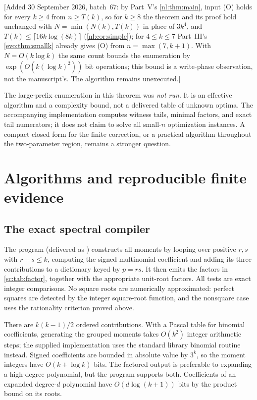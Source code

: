 \documentclass[11pt,a4paper]{article}
\numberwithin{equation}{section}
\theoremstyle{definition}
\theoremstyle{remark}
\begin{document}
[Added 30 September 2026, batch~67: by Part~V's \cref{nl:thm:main}, input
(O) holds for every $k\ge4$ from $n\ge T(k)$, so for $k\ge8$ the theorem and
its proof hold unchanged with $N=\min(N(k),T(k))$ in place of $3k^4$, and
$T(k)\le\lceil16k\log(8k)\rceil$ (\cref{nl:cor:simple}); for $4\le k\le7$
Part~III's \cref{evo:thm:smallk} already gives (O) from $n=\max(7,k+1)$.
With $N=O(k\log k)$ the same count bounds the enumeration by
$\exp(O(k(\log k)^2))$ bit operations; this bound is a write-phase
observation, not the manuscript's. The algorithm remains unexecuted.]

The large-prefix enumeration in this theorem was \emph{not run}. It is
an effective algorithm and a complexity bound, not a delivered table of
unknown optima. The accompanying implementation computes witness tails,
minimal factors, and exact tail numerators; it does not claim to solve
all small-$n$ optimization instances. A compact closed form for the finite
correction, or a practical algorithm throughout the two-parameter region,
remains a stronger question.

\section{Algorithms and reproducible finite evidence}\label{sc:sec:verification}

\subsection{The exact spectral compiler}
The program  (delivered as
) constructs all moments by looping
over positive $r,s$ with $r+s\le k$, computing the signed multinomial
coefficient and adding its three contributions to a dictionary keyed by
$p=rs$. It then emits the factors in \cref{sc:tab:factor}, together with the
appropriate unit-root factors. All tests are exact integer comparisons.
No square roots are numerically approximated: perfect squares are detected
by the integer square-root function, and the nonsquare case uses the
rationality criterion proved above.

There are $k(k-1)/2$ ordered contributions. With a Pascal table for
binomial coefficients, generating the grouped moments takes $O(k^2)$
integer arithmetic steps; the supplied implementation uses the standard
library binomial routine instead. Signed coefficients are bounded in
absolute value by $3^k$, so the moment integers have $O(k+\log k)$ bits.
The factored output is preferable to expanding a high-degree polynomial,
but the program supports both. Coefficients of an expanded degree-$d$
polynomial have $O(d\log(k+1))$ bits by the product bound on its roots.
\end{document}
